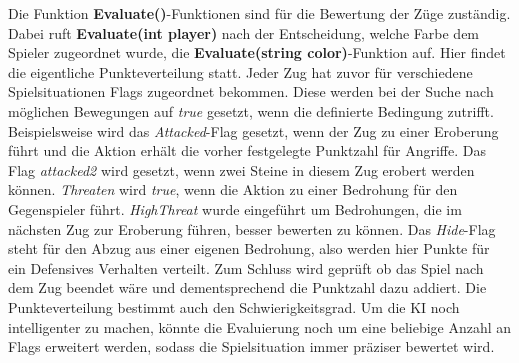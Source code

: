 Die Funktion \textbf{Evaluate()}-Funktionen sind für die Bewertung der Züge zuständig. Dabei ruft \textbf{Evaluate(int player)} nach der Entscheidung, welche Farbe dem Spieler zugeordnet wurde, die \textbf{Evaluate(string color)}-Funktion auf. Hier findet die eigentliche Punkteverteilung statt. Jeder Zug hat zuvor für verschiedene Spielsituationen Flags zugeordnet bekommen. Diese werden bei der Suche nach möglichen Bewegungen auf \textit{true} gesetzt, wenn die definierte Bedingung zutrifft. Beispielsweise wird das \textit{Attacked}-Flag gesetzt, wenn der Zug zu einer Eroberung führt und die Aktion erhält die vorher festgelegte Punktzahl für Angriffe. Das Flag \textit{attacked2} wird gesetzt, wenn zwei Steine in diesem Zug erobert werden können. \textit{Threaten} wird \textit{true}, wenn die Aktion zu einer Bedrohung für den Gegenspieler führt. \textit{HighThreat} wurde eingeführt um Bedrohungen, die im nächsten Zug zur Eroberung führen, besser bewerten zu können. Das \textit{Hide}-Flag steht für den Abzug aus einer eigenen Bedrohung, also werden hier Punkte für ein Defensives Verhalten verteilt. Zum Schluss wird geprüft ob das Spiel nach dem Zug beendet wäre und dementsprechend die Punktzahl dazu addiert. Die Punkteverteilung bestimmt auch den Schwierigkeitsgrad. Um die KI noch intelligenter zu machen, könnte die Evaluierung noch um eine beliebige Anzahl an Flags erweitert werden, sodass die Spielsituation immer präziser bewertet wird.

